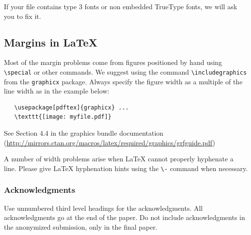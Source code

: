 \documentclass{article}
\begin{document}
If your file contains type 3 fonts or non embedded TrueType fonts, we
will ask you to fix it.

\subsection{Margins in \LaTeX{}}

Most of the margin problems come from figures positioned by hand using
\verb+\special+ or other commands. We suggest using the command
\verb+\includegraphics+ from the \verb+graphicx+ package. Always
specify the figure width as a multiple of the line width as in the
example below:
\begin{verbatim}
   \usepackage[pdftex]{graphicx} ...
   \texttt{[image: myfile.pdf]}
\end{verbatim}
See Section 4.4 in the graphics bundle documentation
(\url{http://mirrors.ctan.org/macros/latex/required/graphics/grfguide.pdf})

A number of width problems arise when \LaTeX{} cannot properly
hyphenate a line. Please give LaTeX hyphenation hints using the
\verb+\-+ command when necessary.

\subsubsection*{Acknowledgments}

Use unnumbered third level headings for the acknowledgments. All
acknowledgments go at the end of the paper. Do not include
acknowledgments in the anonymized submission, only in the final paper.


\small
\medskip









\end{document}
